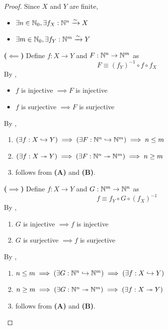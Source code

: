 \begin{proof}
    Since $X$ and $Y$ are finite,
    \begin{itemize}
        \item $\exists n \in \N_{0}, \exists f_{X}: \N^{n} \xrightarrow{\sim} X$
        \item $\exists m \in \N_{0}, \exists f_{Y}: \N^{m} \xrightarrow{\sim} Y$
    \end{itemize}
    \textbf{($\impliedby$)} Define $f: X \to Y$ and $F: \N^{n} \to \N^{m}$ as
    \[
    F \equiv (f_{Y})^{-1} \circ f \circ f_{X}
    \]
    By ,
    \begin{itemize}
        \item $f$ is injective $\implies F$ is injective
        \item $f$ is surjective $\implies F$ is surjective
    \end{itemize}
    By ,
    \begin{enumerate}[label=\textbf{(\Alph*)}]
        \item $\paren*{\exists f: X \hookrightarrow Y} \implies
        \paren*{\exists F: \N^{n} \hookrightarrow \N^{m}} \implies n \leq m$
        \item $\paren*{\exists f: X \twoheadrightarrow Y} \implies
        \paren*{\exists F: \N^{n} \twoheadrightarrow \N^{m}} \implies n \geq m$
        \item follows from \textbf{(A)} and \textbf{(B)}.
    \end{enumerate}
    \textbf{($\implies$)} Define $f: X \to Y$ and $G: \N^{m} \to \N^{n}$ as
    \[
    f \equiv f_{Y} \circ G \circ (f_{X})^{-1}
    \]
    By ,
    \begin{enumerate}[label=\textbf{(\Alph*)}]
        \item $G$ is injective $\implies f$ is injective
        \item $G$ is surjective $\implies f$ is surjective
    \end{enumerate}
    By ,
    \begin{enumerate}[label=\textbf{(\Alph*)}]
        \item $n \leq m \implies \paren*{\exists G: \N^{n} \hookrightarrow \N^{m}}
        \implies \paren*{\exists f: X \hookrightarrow Y}$
        \item $n \geq m \implies \paren*{\exists G: \N^{n} \twoheadrightarrow \N^{m}}
        \implies \paren*{\exists f: X \twoheadrightarrow Y}$
        \item follows from \textbf{(A)} and \textbf{(B)}.
    \end{enumerate}
\end{proof}

